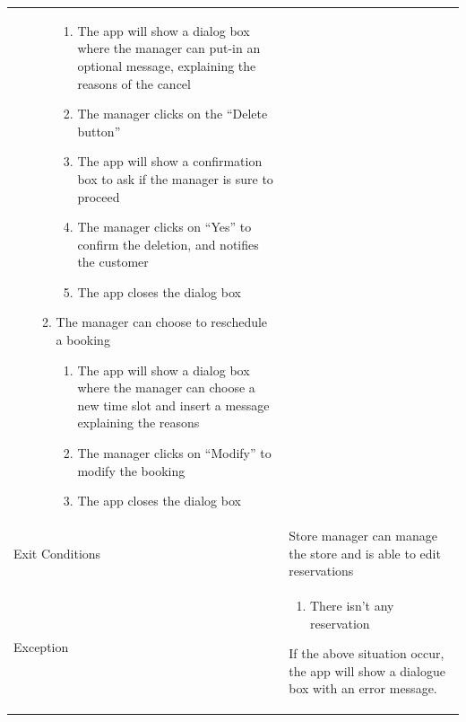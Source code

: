\documentclass{article}
\newcommand\xrowht[2][0]
{\addstackgap[.5\dimexpr#2\relax]{\vphantom{#1}}}
\begin{document}
\begin{center}
\begin{adjustwidth}{-2.8cm}{}
\begin{tabular}[h!]{|m{7.5em}|m{36em}|}
\begin{enumerate}
\begin{enumerate}
									\begin{enumerate}
										
										\item The app will show a dialog box where the manager can put-in an optional message, explaining the reasons of the cancel
										\item The manager clicks on the “Delete button”
										\item The app will show a confirmation box to ask if the manager is sure to proceed
										\item The manager clicks on “Yes” to confirm the deletion, and notifies the customer
										\item The app closes the dialog box
										
									\end{enumerate}
								
									\item The manager can choose to reschedule a booking
									
									\begin{enumerate}
										
										\item The app will show a dialog box where the manager can choose a new time slot and insert a message explaining the reasons
										\item The manager clicks on “Modify” to modify the booking
										\item The app closes the dialog box
										
									\end{enumerate}
									
								\end{enumerate}
								
							\end{enumerate}\\
							\xrowht{5pt}
							Exit Conditions & Store manager can manage the store and is able to edit reservations\\
							\xrowht{5pt}
							Exception & \begin{enumerate}
								
								\itemsep-0.25em
								\item There isn't any reservation
							\end{enumerate}
							If the above situation occur, the app will show a dialogue box with an error message. \\	
							\hline
							

\end{tabular}
\end{adjustwidth}
\end{center}
\end{document}
